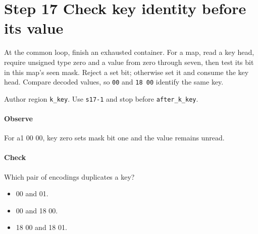 \section{Step 17 Check key identity before its value}\label{cbor-s17}
At the common loop, finish an exhausted container. For a map, read a key head, require unsigned type zero and a value from zero through seven, then test its bit in this map's seen mask. Reject a set bit; otherwise set it and consume the key head. Compare decoded values, so \texttt{00} and \texttt{18 00} identify the same key.

Author region \texttt{k\_key}. Use \texttt{s17-1} and stop before \texttt{after\_k\_key}.

\paragraph{Observe} For a1 00 00, key zero sets mask bit one and the value remains unread.

\paragraph{Check} Which pair of encodings duplicates a key?
\begin{itemize}
  \item[A.] 00 and 01.
  \item[B.] 00 and 18 00.
  \item[C.] 18 00 and 18 01.
\end{itemize}
